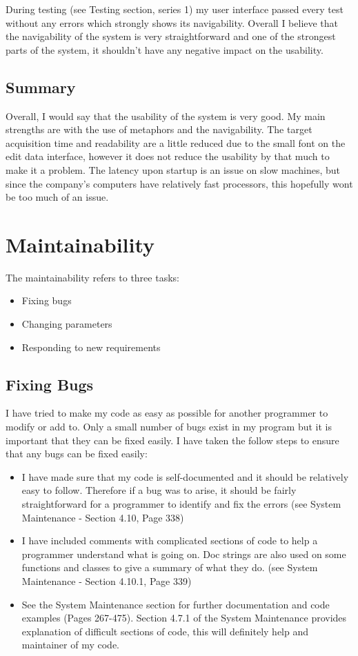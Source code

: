 During testing (see Testing section, series 1) my user interface passed every test without any errors which strongly shows its navigability. Overall I believe that the navigability of the system is very straightforward and one of the strongest parts of the system, it shouldn't have any negative impact on the usability.

\subsection{Summary}

Overall, I would say that the usability of the system is very good. My main strengths are with the use of metaphors and the navigability. The target acquisition time and readability are a little reduced due to the small font on the edit data interface, however it does not reduce the usability by that much to make it a problem. The latency upon startup is an issue on slow machines, but since the company's computers have relatively fast processors, this hopefully wont be too much of an issue.

\section{Maintainability}

The maintainability refers to three tasks:

\begin{itemize}
\item{Fixing bugs}
\item{Changing parameters}
\item{Responding to new requirements}
\end{itemize}

\subsection{Fixing Bugs}

I have tried to make my code as easy as possible for another programmer to modify or add to. Only a small number of bugs exist in my program but it is important that they can be fixed easily. I have taken the follow steps to ensure that any bugs can be fixed easily:
\begin{itemize}
\item{I have made sure that my code is self-documented and it should be relatively easy to follow. Therefore if a bug was to arise, it should be fairly straightforward for a programmer to identify and fix the errors (see System Maintenance - Section 4.10, Page 338)}
\item{I have included comments with complicated sections of code to help a programmer understand what is going on. Doc strings are also used on some functions and classes to give a summary of what they do.  (see System Maintenance - Section 4.10.1, Page 339)}
\item{See the System Maintenance section for further documentation and code examples (Pages 267-475). Section 4.7.1 of the System Maintenance provides explanation of difficult sections of code, this will definitely help and maintainer of my code.}
\end{itemize}


